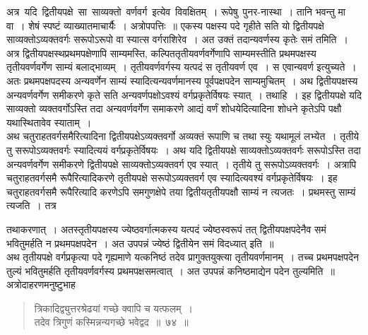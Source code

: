 \documentclass[11pt, openany]{book}
\begin{document}
अत्र \,यदि \,द्वितीयपक्षे \,सा \,साव्यक्तो \,वर्णवर्ग \,इत्येव \,विवक्षितम्~। रूपेषु \,पुनर-नास्था~। तानि भवन्तु मा वा~। शेषं स्पष्टं व्याख्यातमाचार्यैः~। 
अत्रोपपत्तिः~॥ एकस्य पक्षस्य पदे गृहीते सति यो द्वितीयपक्षे 
साव्यक्तोऽव्यक्तवर्गः सरूपोऽरूपो वा स्यात्स वर्गराशिरेव~। अत उक्तं 
तदान्यवर्णस्य कृतेः समं तमिति~। अत्र द्वितीयपक्षस्थप्रथमपक्षेणापि 
साम्यमस्ति, कल्पिततृतीयवर्णवर्गेणापि साम्यमस्तीति प्रथमपक्षस्य
तृतीयवर्णवर्गेण साम्यं बलाद्भाव्यम्~। तृतीयवर्णवर्गस्य यत्पदं स तृतीयवर्ण एव~। स
एवान्यवर्ण इत्युच्यते~। अतः प्रथमपक्षपदस्य अन्यवर्णेन साम्यं स्यादित्यन्यवर्णमानस्य
पूर्वपक्षपदेन साम्यमुचितम्~। अथ द्वितीयपक्षस्य अन्यवर्णवर्गेण समीकरणे कृते 
सति अन्यवर्णपक्षोऽवश्यं वर्गप्रकृतेर्विषयः स्यात्~। तथाहि~। इह द्वितीयपक्षे
यदि साव्यक्तो व्यक्तवर्गोऽस्ति तदा अन्यवर्णवर्गेण समाकरणे आद्यं वर्णं 
शोधयेदित्यादिना शोधने कृतेऽपि पक्षौ यथास्थितावेव स्याताम्~। \\

\vspace{-3mm}
 अथ चतुराहतवर्गसमैरित्यादिना द्वितीयपक्षेऽव्यक्तवर्गो अव्यक्तं रूपाणि च
तथा स्युः यथामूलं लभ्येत~। तृतीये तु सरूपोऽव्यक्तवर्गः स्यादित्ययं वर्गप्रकृतेर्विषयः~। 
अथ यदि द्वितीयपक्षे साव्यक्तोऽव्यक्तवर्गः सरूपोऽस्ति तदा अन्यवर्णवर्गेण समीकरणे 
द्वितीयपक्षे साव्यक्तोऽव्यक्तवर्ग एव स्यात्~। तृतीये तु सरूपोऽव्यक्तवर्गः~। अत्रापि 
चतुराहतवर्गसमै रूपैरित्यादिकरणे तृतीयपक्षे सरूपोऽव्यक्तवर्ग एव स्यादित्यवश्यं 
वर्गप्रकृतेर्विषयः~। इह चतुराहतवर्गसमै रूपैरित्यादि करणेऽपि समगुणक्षेपे
तया द्वितीयतृतीयपक्षौ साम्यं न त्यजतः~। प्रथमस्तु साम्यं त्यजति~। तत्र
\newpage

\noindent तथाकरणात्~। अतस्तृतीयपक्षस्य ज्येष्ठवर्गात्मकस्य यत्पदं ज्येष्ठस्वरूपं
तत् द्वितीयपक्षपदेनैव समं भवितुमर्हति न प्रथमपक्षपदेन~। अत उपपन्नं
ज्येष्ठं द्वितीयेन समं विदध्यात् इति~॥ \\

\vspace{-3mm}
 अथ तृतीयपक्षे वर्गप्रकृत्या पदे गृह्यमाणे यत्कनिष्ठं तदेव 
प्रागुक्तयुक्त्या तृतीयवर्णमानम्~। तच्च प्रथमपक्षपदेन तुल्यं भवितुमर्हति
तृतीयवर्णवर्गस्य प्रथमपक्षसमत्वात्~। अत उपपन्नं कनिष्ठमाद्येन पदेन तुल्यमिति~॥ \\

\vspace{-3mm}
 अत्रोदाहरणमनुष्टुभाह\textendash 
 \begin{quote}
     \ex
      त्रिकादिद्व्युत्तरश्रेढयां गच्छे क्वापि च यत्फलम्~। \\
 तदेव त्रिगुणं कस्मिन्नन्यगच्छे भवेद्वद~॥~७४~॥~
 \end{quote}
 
\end{document}

